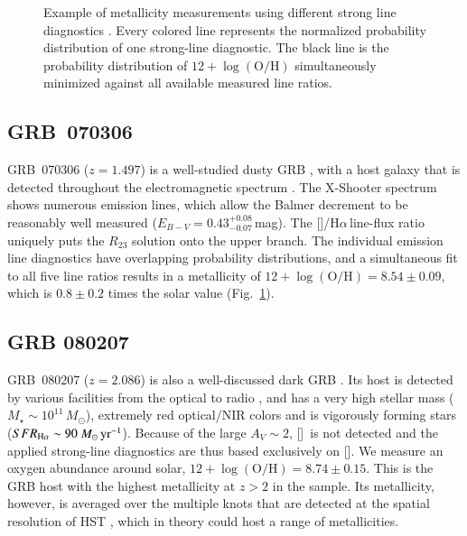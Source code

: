 \documentclass[traditabstract, longauth]{aa}
\newcommand{\ha}{H$\alpha$}
\newcommand{\oh}{12+\log(\mathrm{O/H})}
\newcommand{\oii}{[\ion{O}{ii}]}
\newcommand{\nii}{[\ion{N}{ii}]}
\newcommand{\Msun}{$M_\odot$}
\newcommand{\Msunyr}{$M_\odot\,\rm{yr}^{-1}$}
\begin{document}
\begin{appendix}
\begin{figure}
\begin{subfigure}{.33\textwidth}
\end{subfigure}
\caption{Example of metallicity measurements using different strong line diagnostics \citep{2006A&A...459...85N, 2008A&A...488..463M}. Every colored line represents the normalized probability distribution of one strong-line diagnostic. The black line is the probability distribution of $\oh$ simultaneously minimized against all available measured line ratios.}
\label{fig:zexamples}
\end{figure}

\subsection{GRB~070306} GRB~070306 ($z=1.497$) is a well-studied dusty GRB \citep{2008ApJ...681..453J}, with a host galaxy that is detected throughout the electromagnetic spectrum \citep{2014A&A...565A.112H, 2014arXiv1408.5076S, 2015ApJ...801..102P}. The X-Shooter spectrum shows numerous emission lines, which allow the Balmer decrement to be reasonably well measured ($E_{B-V} = 0.43_{-0.07}^{+0.08}$\,mag). The \nii/\ha\,line-flux ratio uniquely puts the $R_{23}$ solution onto the upper branch. The individual emission line diagnostics have overlapping probability distributions, and a simultaneous fit to all five line ratios results in a metallicity of $\oh=8.54\pm0.09$, which is $0.8\pm0.2$ times the solar value (Fig.~\ref{fig:zexamples}).

\subsection{GRB 080207} GRB~080207 ($z=2.086$) is also a well-discussed dark GRB \citep{2011ApJ...736L..36H, 2012MNRAS.421...25S}. Its host is detected by various facilities from the optical to radio \citep{2012A&A...545A..77R, 2013ApJ...778..128P}, and has a very high stellar mass ($M_{\star}\sim10^{11}$\,\Msun), extremely red optical/NIR colors and is vigorously forming stars ($SFR_{\rm{H\alpha}}\sim 90\,$\Msunyr). Because of the large $A_V\sim2$, \oii\, is not detected and the applied strong-line diagnostics are thus based exclusively on \nii. We measure an oxygen abundance around solar, $\oh = 8.74\pm0.15$. This is the GRB host with the highest metallicity at $z>2$ in the sample. Its metallicity, however, is averaged over the multiple knots that are detected at the spatial resolution of HST \citep{2012MNRAS.421...25S}, which in theory could host a range of metallicities. 


\end{appendix}
\end{document}
